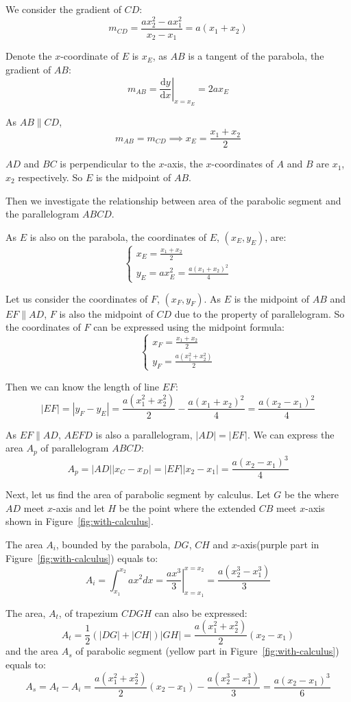 \documentclass[a4paper,11pt]{article}
\theoremstyle{definition}
\newcommand{\dd}{\mathrm{d}}
\begin{document}
We consider the gradient of $CD$:
$$
m_{CD}=\frac{ax_2^2-ax_1^2}{x_2-x_1}=a(x_1+x_2)
$$

Denote the $x$-coordinate of $E$ is $x_E$, as $AB$ is a tangent of the parabola, the gradient of $AB$:
$$
m_{AB}=\left.\frac{\dd y}{\dd x}\right|_{x=x_E}=2ax_E
$$

As $AB\parallel CD$, 
$$
m_{AB}=m_{CD} \implies x_E=\frac{x_1+x_2}{2}
$$

$AD$ and $BC$ is perpendicular to the $x$-axis, the $x$-coordinates of $A$ and $B$ are $x_1$, $x_2$ respectively. So $E$ is the midpoint of $AB$.

\newpage

Then we investigate the relationship between area of the parabolic segment and the parallelogram $ABCD$.

As $E$ is also on the parabola, the coordinates of $E$, $(x_E,y_E)$, are: 
$$
\begin{cases}
x_E=\frac{x_1+x_2}{2} \\
y_E=ax_E^2=\frac{a(x_1+x_2)^2}{4}
\end{cases}
$$

Let us consider the coordinates of $F$, $(x_F,y_F)$. As $E$ is the midpoint of $AB$ and $EF\parallel AD$, $F$ is also the midpoint of $CD$ due to the property of parallelogram. So the coordinates of $F$ can be expressed using the midpoint formula:
$$
\begin{cases}
x_F=\frac{x_1+x_2}{2} \\
y_F=\frac{a(x_1^2+x_2^2)}{2}
\end{cases}
$$

Then we can know the length of line $EF$:
$$
|EF|=|y_F-y_E|=\frac{a(x_1^2+x_2^2)}{2}-\frac{a(x_1+x_2)^2}{4}=\frac{a(x_2-x_1)^2}{4}
$$

As $EF\parallel AD$, $AEFD$ is also a parallelogram, $|AD|=|EF|$. We can express the area $A_p$ of parallelogram $ABCD$:
$$
A_p=|AD||x_C-x_D|=|EF||x_2-x_1|=\frac{a(x_2-x_1)^3}{4}
$$

Next, let us find the area of parabolic segment by calculus. Let $G$ be the where $AD$ meet $x$-axis and let $H$ be the point where the extended $CB$ meet $x$-axis shown in Figure~\ref{fig:with-calculus}.

The area $A_i$, bounded by the parabola, $DG$, $CH$ and $x$-axis(purple part in Figure~\ref{fig:with-calculus}) equals to:
$$
A_i=\int_{x_1}^{x_2} ax^2dx=\left.\frac{ax^3}{3}\right|_{x=x_1}^{x=x_2}=\frac{a(x_2^3-x_1^3)}{3}
$$

The area, $A_t$, of trapezium $CDGH$ can also be expressed:
$$
A_t=\frac{1}{2}(|DG|+|CH|)|GH|=\frac{a(x_1^2+x_2^2)}{2}(x_2-x_1)
$$
and the area $A_s$ of parabolic segment (yellow part in Figure~\ref{fig:with-calculus}) equals to:
$$
A_s=A_t-A_i=\frac{a(x_1^2+x_2^2)}{2}(x_2-x_1)-\frac{a(x_2^3-x_1^3)}{3}=\frac{a(x_2-x_1)^3}{6}
$$
\end{document}
